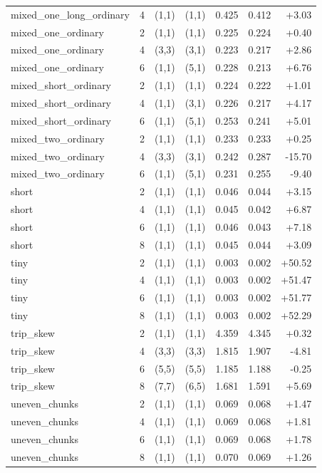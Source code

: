 \begin{center}
\begin{longtable}{lrrrrrr}
mixed\_one\_long\_ordinary & 4 & (1,1) & (1,1) & 0.425 & 0.412 & +3.03 \\
mixed\_one\_ordinary & 2 & (1,1) & (1,1) & 0.225 & 0.224 & +0.40 \\
mixed\_one\_ordinary & 4 & (3,3) & (3,1) & 0.223 & 0.217 & +2.86 \\
mixed\_one\_ordinary & 6 & (1,1) & (5,1) & 0.228 & 0.213 & +6.76 \\
mixed\_short\_ordinary & 2 & (1,1) & (1,1) & 0.224 & 0.222 & +1.01 \\
mixed\_short\_ordinary & 4 & (1,1) & (3,1) & 0.226 & 0.217 & +4.17 \\
mixed\_short\_ordinary & 6 & (1,1) & (5,1) & 0.253 & 0.241 & +5.01 \\
mixed\_two\_ordinary & 2 & (1,1) & (1,1) & 0.233 & 0.233 & +0.25 \\
mixed\_two\_ordinary & 4 & (3,3) & (3,1) & 0.242 & 0.287 & -15.70 \\
mixed\_two\_ordinary & 6 & (1,1) & (5,1) & 0.231 & 0.255 & -9.40 \\
short & 2 & (1,1) & (1,1) & 0.046 & 0.044 & +3.15 \\
short & 4 & (1,1) & (1,1) & 0.045 & 0.042 & +6.87 \\
short & 6 & (1,1) & (1,1) & 0.046 & 0.043 & +7.18 \\
short & 8 & (1,1) & (1,1) & 0.045 & 0.044 & +3.09 \\
tiny & 2 & (1,1) & (1,1) & 0.003 & 0.002 & +50.52 \\
tiny & 4 & (1,1) & (1,1) & 0.003 & 0.002 & +51.47 \\
tiny & 6 & (1,1) & (1,1) & 0.003 & 0.002 & +51.77 \\
tiny & 8 & (1,1) & (1,1) & 0.003 & 0.002 & +52.29 \\
trip\_skew & 2 & (1,1) & (1,1) & 4.359 & 4.345 & +0.32 \\
trip\_skew & 4 & (3,3) & (3,3) & 1.815 & 1.907 & -4.81 \\
trip\_skew & 6 & (5,5) & (5,5) & 1.185 & 1.188 & -0.25 \\
trip\_skew & 8 & (7,7) & (6,5) & 1.681 & 1.591 & +5.69 \\
uneven\_chunks & 2 & (1,1) & (1,1) & 0.069 & 0.068 & +1.47 \\
uneven\_chunks & 4 & (1,1) & (1,1) & 0.069 & 0.068 & +1.81 \\
uneven\_chunks & 6 & (1,1) & (1,1) & 0.069 & 0.068 & +1.78 \\
uneven\_chunks & 8 & (1,1) & (1,1) & 0.070 & 0.069 & +1.26 \\

\end{longtable}
\end{center}
